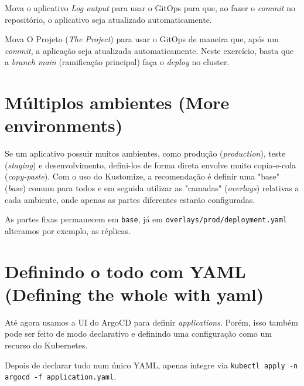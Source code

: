 \documentclass[11pt,a4paper]{article}
\begin{document}
\begin{tcolorbox}[colback=blue!5!white,colframe=blue!75!black,title=Exercício 4.7: Passos de bebê para GitOps]
Mova o aplicativo \textit{Log output} para usar o GitOps para que, ao fazer o \textit{commit} no repositório, o aplicativo seja atualizado automaticamente.
\end{tcolorbox}

\begin{tcolorbox}[colback=blue!5!white,colframe=blue!75!black,title=Exercício 4.8: O Projeto, etapa 24]
Mova O Projeto (\textit{The Project}) para usar o GitOps de maneira que, após um \textit{commit}, a aplicação seja atualizada automaticamente. Neste exercício, basta que a \textit{branch main} (ramificação principal) faça o \textit{deploy} no cluster.
\end{tcolorbox}

\section*{\color{primary}Múltiplos ambientes (More environments)}

Se um aplicativo possuir muitos ambientes, como produção (\textit{production}), teste (\textit{staging}) e desenvolvimento, defini-los de forma direta envolve muito copia-e-cola (\textit{copy-paste}). Com o uso do Kustomize, a recomendação é definir uma "base" (\textit{base}) comum para todos e em seguida utilizar as "camadas" (\textit{overlays}) relativas a cada ambiente, onde apenas as partes diferentes estarão configuradas.

As partes fixas permanecem em \texttt{base}, já em \texttt{overlays/prod/deployment.yaml} alteramos por exemplo, as réplicas.

\section*{\color{primary}Definindo o todo com YAML (Defining the whole with yaml)}

Até agora usamos a UI do ArgoCD para definir \textit{applications}. Porém, isso também pode ser feito de modo declarativo e definindo uma configuração como um recurso do Kubernetes.

Depois de declarar tudo num único YAML, apenas integre via \texttt{kubectl apply -n argocd -f application.yaml}.
\end{document}
